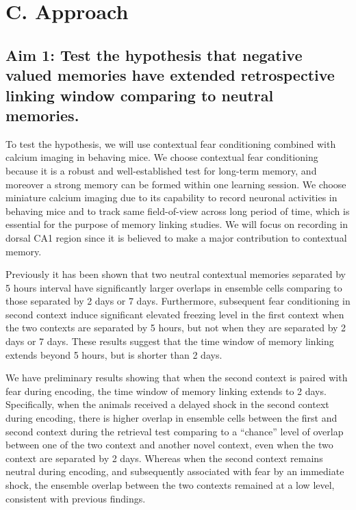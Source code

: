 \documentclass[master.tex]{subfiles}
\begin{document}
\section*{C. Approach}

\subsection*{Aim 1: Test the hypothesis that negative valued memories have
  extended retrospective linking window comparing to neutral memories.}

To test the hypothesis, we will use contextual fear conditioning combined with
calcium imaging in behaving mice. We choose contextual fear conditioning because
it is a robust and well-established test for long-term memory, and moreover a
strong memory can be formed within one learning session. We choose miniature
calcium imaging due to its capability to record neuronal activities in behaving
mice and to track same field-of-view across long period of time, which is
essential for the purpose of memory linking studies. We will focus on recording
in dorsal CA1 region since it is believed to make a major contribution to
contextual memory.

Previously it has been shown that two neutral contextual memories separated by 5
hours interval have significantly larger overlaps in ensemble cells comparing to
those separated by 2 days or 7 days. Furthermore, subsequent fear conditioning
in second context induce significant elevated freezing level in the first
context when the two contexts are separated by 5 hours, but not when they are
separated by 2 days or 7 days. These results suggest that the time window of
memory linking extends beyond 5 hours, but is shorter than 2 days.

We have preliminary results showing that when the second context is paired with
fear during encoding, the time window of memory linking extends to 2 days.
Specifically, when the animals received a delayed shock in the second context
during encoding, there is higher overlap in ensemble cells between the first and
second context during the retrieval test comparing to a ``chance'' level of
overlap between one of the two context and another novel context, even when the
two context are separated by 2 days. Whereas when the second context remains
neutral during encoding, and subsequently associated with fear by an immediate
shock, the ensemble overlap between the two contexts remained at a low level,
consistent with previous findings.
\end{document}
